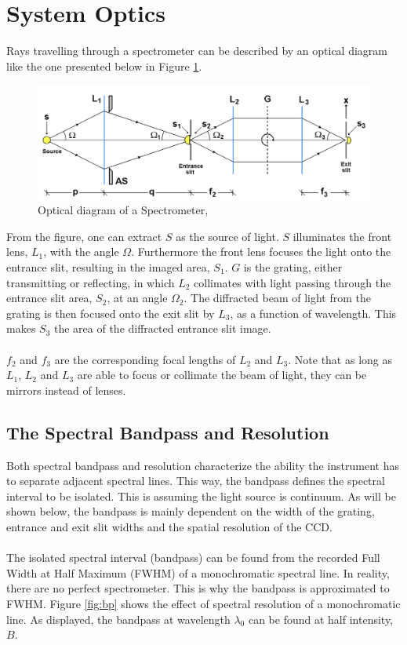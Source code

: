 \section{System Optics} \label{sec:sysopt}
Rays travelling through a spectrometer can be described by an optical diagram like the one presented below in Figure \ref{fig:sysopt}.
\begin{figure}[H]
    \centering
    \includegraphics[width = 12cm]{Images/theory/sysop.png}
    \caption[Spectrometer, Optical Diagram]{Optical diagram of a Spectrometer, \cite{sigernes2018}}
    \label{fig:sysopt}
\end{figure}
\noindent
From the figure, one can extract $S$ as the source of light. $S$ illuminates the front lens, $L_1$, with the angle $\Omega$. Furthermore the front lens focuses the light onto the entrance slit, resulting in the imaged area, $S_1$. $G$ is the grating, either transmitting or reflecting, in which $L_2$ collimates with light passing through the entrance slit area, $S_2$, at an angle  $\Omega_2$. The diffracted beam of light from the grating is then focused onto the exit slit by $L_3$, as a function of wavelength. This makes $S_3$ the area of the diffracted entrance slit image. 
\\\\
$f_2$ and $f_3$ are the corresponding focal lengths of $L_2$ and $L_3$. Note that as long as $L_1$, $L_2$ and $L_3$ are able to focus or collimate the beam of light, they can be mirrors instead of lenses. 


\subsection{The Spectral Bandpass and Resolution} \label{sec:bp}
Both spectral bandpass and resolution characterize the ability the instrument has to separate adjacent spectral lines. This way, the bandpass defines the spectral interval to be isolated. This is assuming the light source is continuum. As will be shown below, the bandpass is mainly dependent on  the width of the grating, entrance and exit slit widths and the spatial resolution of the CCD. 
\\\\
The isolated spectral interval (bandpass) can be found from the recorded Full Width at Half Maximum (FWHM) of a monochromatic spectral line. In reality, there are no perfect spectrometer. This is why the bandpass is approximated to FWHM. Figure \ref{fig:bp} shows the effect of spectral resolution of a monochromatic line. As displayed, the bandpass at wavelength $\lambda_0$ can be found at half intensity, $B$. 

